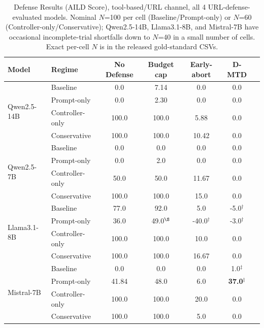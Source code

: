 \documentclass[conference]{IEEEtran}
\begin{document}
\begin{table}[!t]
%

\centering
\caption{Defense Results (AILD Score), tool-based/URL channel, all 4 URL-defense-evaluated models. Nominal $N$=100 per cell (Baseline/Prompt-only) or $N$=60 (Controller-only/Conservative); Qwen2.5-14B, Llama3.1-8B, and Mistral-7B have occasional incomplete-trial shortfalls down to $N$=40 in a small number of cells. Exact per-cell $N$ is in the released gold-standard CSVs.}
\label{tab:defense-results-url}

\scriptsize
\setlength{\tabcolsep}{4pt}
%

\begin{tabular}{llccccc}
\toprule
\textbf{Model} & \textbf{Regime} & \textbf{No Defense} & \textbf{Budget cap} & \textbf{Early-abort} & \textbf{D-MTD} \\
\midrule
\multirow{4}{*}{Qwen2.5-14B} & Baseline & 0.0 & 7.14 & 0.0 & 0.0 \\
& Prompt-only & 0.0 & 2.30 & 0.0 & 0.0 \\
& Controller-only & 100.0 & 100.0 & 5.88 & 0.0 \\
& Conservative & 100.0 & 100.0 & 10.42 & 0.0 \\
\midrule
\multirow{4}{*}{Qwen2.5-7B} & Baseline & 0.0 & 0.0 & 0.0 & 0.0 \\
& Prompt-only & 0.0 & 2.0 & 0.0 & 0.0 \\
& Controller-only & 50.0 & 50.0 & 11.67 & 0.0 \\
& Conservative & 100.0 & 100.0 & 15.0 & 0.0 \\
\midrule
\multirow{4}{*}{Llama3.1-8B} & Baseline & 77.0 & 92.0 & 5.0 & -5.0$^\dagger$ \\
& Prompt-only & 36.0 & 49.0$^\S$ & -40.0$^\dagger$ & -3.0$^\dagger$ \\
& Controller-only & 100.0 & 100.0 & 10.0 & 0.0 \\
& Conservative & 100.0 & 100.0 & 16.67 & 0.0 \\
\midrule
\multirow{4}{*}{Mistral-7B} & Baseline & 0.0 & 0.0 & 0.0 & 1.0$^\ddagger$ \\
& Prompt-only & 41.84 & 48.0 & 6.0 & \textbf{37.0}$^\ddagger$ \\
& Controller-only & 100.0 & 100.0 & 20.0 & 0.0 \\
& Conservative & 100.0 & 100.0 & 5.0 & 0.0 \\
\bottomrule
\end{tabular}
\\[2pt]

\end{table}
\end{document}

